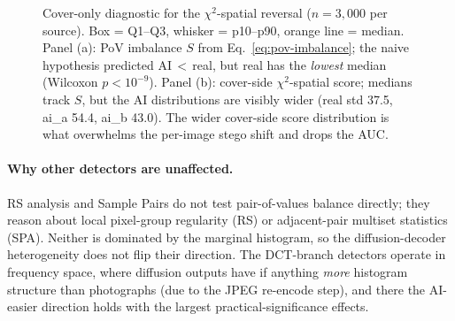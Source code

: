 \documentclass[10pt,twocolumn,a4paper]{article}
\begin{document}
\begin{figure}[t]
\caption{Cover-only diagnostic for the $\chi^2$-spatial reversal ($n\!=\!3{,}000$ per source). Box = Q1--Q3, whisker = p10--p90, orange line = median. Panel (a): PoV imbalance $S$ from Eq.~\ref{eq:pov-imbalance}; the naive hypothesis predicted AI\,$<$\,real, but real has the \emph{lowest} median (Wilcoxon $p\!<\!10^{-9}$). Panel (b): cover-side $\chi^2$-spatial score; medians track $S$, but the AI distributions are visibly wider (real std 37.5, ai\_a 54.4, ai\_b 43.0). The wider cover-side score distribution is what overwhelms the per-image stego shift and drops the AUC.}
\label{fig:pov}
\end{figure}
\fi

\paragraph{Why other detectors are unaffected.} RS analysis and Sample Pairs do not test pair-of-values balance directly; they reason about local pixel-group regularity (RS) or adjacent-pair multiset statistics (SPA). Neither is dominated by the marginal histogram, so the diffusion-decoder heterogeneity does not flip their direction. The DCT-branch detectors operate in frequency space, where diffusion outputs have if anything \emph{more} histogram structure than photographs (due to the JPEG re-encode step), and there the AI-easier direction holds with the largest practical-significance effects.
\end{document}
